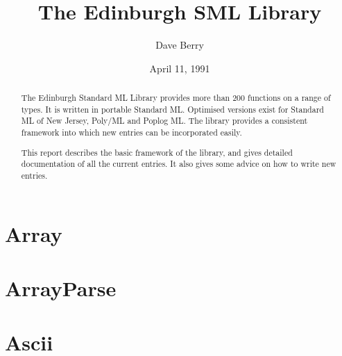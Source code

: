 %
%
%
%
%


\title{The Edinburgh SML Library}
\author{Dave Berry}
\date{April 11, 1991}



\maketitle

\begin{abstract}
The Edinburgh Standard ML Library provides more than 200 functions
on a range of types.  It is written in portable Standard ML.
Optimised versions exist for Standard ML of New Jersey, Poly/ML
and Poplog ML.  The library provides a consistent framework
into which new entries can be incorporated easily.

This report describes the basic framework of the library, and
gives detailed documentation of all the current entries.  It
also gives some advice on how to write new entries.
\end{abstract}

\tableofcontents









\section{Array}


\newpage
\section{ArrayParse}


\newpage
\section{Ascii}


